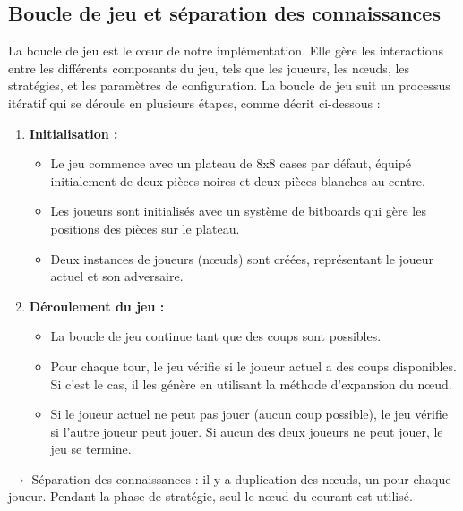 \subsection{Boucle de jeu et séparation des connaissances}
\label{subsec:game_loop}
La boucle de jeu est le cœur de notre implémentation. Elle gère les interactions entre les différents composants du jeu, tels que les joueurs, les nœuds, les stratégies, et les paramètres de configuration. La boucle de jeu suit un processus itératif qui se déroule en plusieurs étapes, comme décrit ci-dessous :

\begin{enumerate}
    \item \textbf{Initialisation :}
    \begin{itemize}
        \item Le jeu commence avec un plateau de 8x8 cases par défaut, équipé initialement de deux pièces noires et deux pièces blanches au centre.
        \item Les joueurs sont initialisés avec un système de bitboards qui gère les positions des pièces sur le plateau.
        \item Deux instances de joueurs (nœuds) sont créées, représentant le joueur actuel et son adversaire.
    \end{itemize}
    
    \item \textbf{Déroulement du jeu :}
    \begin{itemize}
        \item La boucle de jeu continue tant que des coups sont possibles.
        \item Pour chaque tour, le jeu vérifie si le joueur actuel a des coups disponibles. Si c'est le cas, il les génère en utilisant la méthode d'expansion du nœud.
        \item Si le joueur actuel ne peut pas jouer (aucun coup possible), le jeu vérifie si l'autre joueur peut jouer. Si aucun des deux joueurs ne peut jouer, le jeu se termine.
    \end{itemize}
\end{enumerate}
$\rightarrow$ Séparation des connaissances : il y a duplication des nœuds, un pour chaque joueur. Pendant la phase de stratégie, seul le nœud du courant est utilisé.

